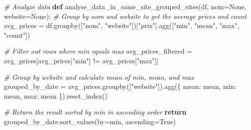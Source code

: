 \documentclass[
]{article}
\newenvironment{Shaded}{}{}
\newcommand{\CommentTok}[1]{\textcolor[rgb]{0.38,0.63,0.69}{\textit{#1}}}
\newcommand{\ControlFlowTok}[1]{\textcolor[rgb]{0.00,0.44,0.13}{\textbf{#1}}}
\newcommand{\KeywordTok}[1]{\textcolor[rgb]{0.00,0.44,0.13}{\textbf{#1}}}
\newcommand{\NormalTok}[1]{#1}
\newcommand{\OperatorTok}[1]{\textcolor[rgb]{0.40,0.40,0.40}{#1}}
\newcommand{\StringTok}[1]{\textcolor[rgb]{0.25,0.44,0.63}{#1}}
\newcommand{\VariableTok}[1]{\textcolor[rgb]{0.10,0.09,0.49}{#1}}
\begin{document}
\hypertarget{e8e15245-8b51-4a6c-b58c-0dd2d9500710}{}
\begin{Shaded}
\begin{Highlighting}[]
\CommentTok{\# Analyze data}
\KeywordTok{def}\NormalTok{ analyse\_data\_in\_same\_site\_grouped\_sites(df, nom}\OperatorTok{=}\VariableTok{None}\NormalTok{, website}\OperatorTok{=}\VariableTok{None}\NormalTok{):}
    \CommentTok{\# Group by \textquotesingle{}nom\textquotesingle{} and \textquotesingle{}website\textquotesingle{} to get the average prices and count}
\NormalTok{    avg\_prices }\OperatorTok{=}\NormalTok{ df.groupby([}\StringTok{"nom"}\NormalTok{, }\StringTok{"website"}\NormalTok{])[}\StringTok{"prix"}\NormalTok{].agg([}\StringTok{"min"}\NormalTok{, }\StringTok{"mean"}\NormalTok{, }\StringTok{"max"}\NormalTok{, }\StringTok{"count"}\NormalTok{])}

    \CommentTok{\# Filter out rows where min equals max}
\NormalTok{    avg\_prices\_filtered }\OperatorTok{=}\NormalTok{ avg\_prices[avg\_prices[}\StringTok{"min"}\NormalTok{] }\OperatorTok{!=}\NormalTok{ avg\_prices[}\StringTok{"max"}\NormalTok{]]}

    \CommentTok{\# Group by \textquotesingle{}website\textquotesingle{} and calculate mean of \textquotesingle{}min\textquotesingle{}, \textquotesingle{}mean\textquotesingle{}, and \textquotesingle{}max\textquotesingle{}}
\NormalTok{    grouped\_by\_date }\OperatorTok{=}\NormalTok{ avg\_prices.groupby([}\StringTok{"website"}\NormalTok{]).agg(\{}
        \StringTok{\textquotesingle{}mean\textquotesingle{}}\NormalTok{: }\StringTok{\textquotesingle{}mean\textquotesingle{}}\NormalTok{,}
        \StringTok{\textquotesingle{}min\textquotesingle{}}\NormalTok{: }\StringTok{\textquotesingle{}mean\textquotesingle{}}\NormalTok{,}
        \StringTok{\textquotesingle{}max\textquotesingle{}}\NormalTok{: }\StringTok{\textquotesingle{}mean\textquotesingle{}}
\NormalTok{    \}).reset\_index()}

    \CommentTok{\# Return the result sorted by \textquotesingle{}min\textquotesingle{} in ascending order}
    \ControlFlowTok{return}\NormalTok{ grouped\_by\_date.sort\_values(by}\OperatorTok{=}\StringTok{\textquotesingle{}min\textquotesingle{}}\NormalTok{, ascending}\OperatorTok{=}\VariableTok{True}\NormalTok{)}
\end{Highlighting}
\end{Shaded}
\end{document}
